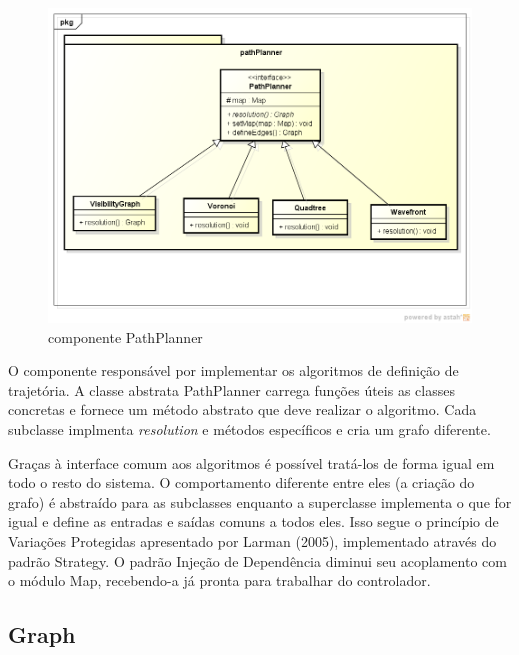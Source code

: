 \begin{figure}[h]
	\centering
	\label{fig24}
		\includegraphics[keepaspectratio=true,scale=0.5]{figuras/pkgpathplanner.png}
	\caption{componente PathPlanner}
\end{figure}

O componente responsável por implementar os algoritmos de definição de trajetória. A classe abstrata PathPlanner carrega funções úteis as classes concretas e fornece um método abstrato que deve realizar o algoritmo. Cada subclasse implmenta \textit{resolution} e métodos específicos e cria um grafo diferente.

Graças à interface comum aos algoritmos é possível tratá-los de forma igual em todo o resto do sistema. O comportamento diferente entre eles (a criação do grafo) é abstraído para as subclasses enquanto a superclasse implementa o que for igual e define as entradas e saídas comuns a todos eles. Isso segue o princípio de Variações Protegidas apresentado por Larman (2005), implementado através do padrão Strategy. O padrão Injeção de Dependência diminui seu acoplamento com o módulo Map, recebendo-a já pronta para trabalhar do controlador.

\subsection{Graph}


